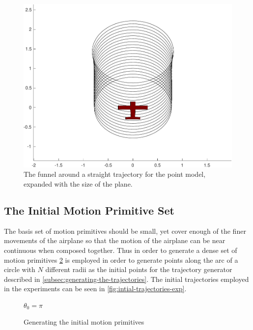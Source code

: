 \begin{figure}[!t]
\includegraphics[width=.95\columnwidth]{figures/experiments/expanded-funnel-with-plane}
\caption{The funnel around a straight trajectory for the point model,
expanded with the size of the plane.}
\label{fig:expanded-and-unexpanded}
\end{figure}

\subsection{The Initial Motion Primitive Set}
\label{subsec:initial-motion-primitive}

The basis set of motion primitives should be small, yet cover enough of the
finer movements of the airplane so that the motion of the airplane can be near
continuous when composed together. Thus in order to generate a dense set of
motion primitives \cref{alg:initial-motion-primitives-generation} is employed in
order to generate points along the arc of a circle with \(N\) different radii as
the initial points for the trajectory generator described in
\cref{subsec:generating-the-trajectories}. The initial trajectories employed in
the experiments can be seen in \cref{fig:intial-trajectories-exp}.

\begin{figure}[!t]
  \caption{Generating the initial motion primitives}
  \label{alg:initial-motion-primitives-generation}
  \DontPrintSemicolon \SetAlgoNoLine

   

  \(\theta_{0} = \pi\) \;

  \;
\end{figure}

